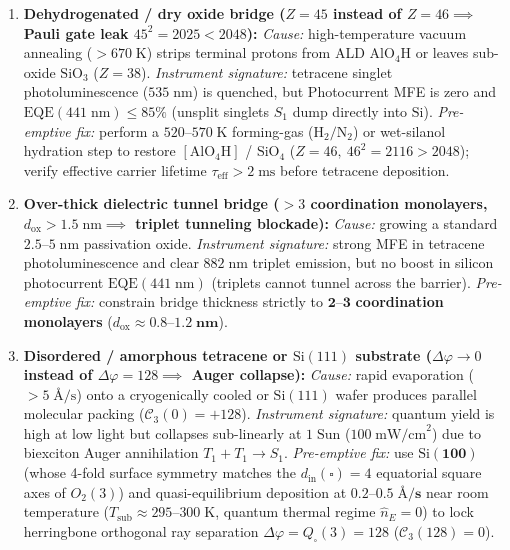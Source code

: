 \documentclass[11pt,a4paper]{article}
\theoremstyle{plain}
\theoremstyle{definition}
\begin{document}
\begin{enumerate}[label=\textbf{(F\arabic*)},leftmargin=*,noitemsep]
\item \textbf{Dehydrogenated / dry oxide bridge ($Z = 45$ instead of $Z = 46 \implies$ Pauli gate leak $45^2 = 2025 < 2048$):}
  \emph{Cause:} high-temperature vacuum annealing ($>670\;\text{K}$) strips terminal protons from ALD $\mathrm{AlO_4H}$ or leaves sub-oxide $\mathrm{SiO_3}$ ($Z=38$).
  \emph{Instrument signature:} tetracene singlet photoluminescence ($535\;\text{nm}$) is quenched, but Photocurrent MFE is zero and $\mathrm{EQE}(441\;\text{nm})\le 85\%$ (unsplit singlets $S_1$ dump directly into $\mathrm{Si}$).
  \emph{Pre-emptive fix:} perform a $520\text{--}570\;\text{K}$ forming-gas ($\mathrm{H_2/N_2}$) or wet-silanol hydration step to restore $[\mathrm{AlO_4H}]$ / $\mathrm{SiO_4}$ ($Z=46,\ 46^2=2116>2048$); verify effective carrier lifetime $\tau_{\mathrm{eff}} > 2\;\text{ms}$ before tetracene deposition.
\item \textbf{Over-thick dielectric tunnel bridge ($>3$ coordination monolayers, $d_{\mathrm{ox}} > 1.5\;\text{nm} \implies$ triplet tunneling blockade):}
  \emph{Cause:} growing a standard $2.5\text{--}5\;\text{nm}$ passivation oxide.
  \emph{Instrument signature:} strong MFE in tetracene photoluminescence and clear $882\;\text{nm}$ triplet emission, but no boost in silicon photocurrent $\mathrm{EQE}(441\;\text{nm})$ (triplets cannot tunnel across the barrier).
  \emph{Pre-emptive fix:} constrain bridge thickness strictly to $\mathbf{2\text{--}3}$ \textbf{coordination monolayers} ($d_{\mathrm{ox}} \approx \mathbf{0.8\text{--}1.2\;\text{nm}}$).
\item \textbf{Disordered / amorphous tetracene or $\mathrm{Si}(111)$ substrate ($\Delta\varphi \to 0$ instead of $\Delta\varphi = 128 \implies$ Auger collapse):}
  \emph{Cause:} rapid evaporation ($>5\;\text{\AA/s}$) onto a cryogenically cooled or $\mathrm{Si}(111)$ wafer produces parallel molecular packing ($\mathcal{C}_3(0) = +128$).
  \emph{Instrument signature:} quantum yield is high at low light but collapses sub-linearly at $1\;\text{Sun}$ ($100\;\text{mW/cm}^2$) due to biexciton Auger annihilation $T_1 + T_1 \to S_1$.
  \emph{Pre-emptive fix:} use $\mathbf{\mathrm{Si}(100)}$ (whose 4-fold surface symmetry matches the $d_{\mathrm{in}}(\square)=4$ equatorial square axes of $O_2(3)$) and quasi-equilibrium deposition at $\mathbf{0.2\text{--}0.5\;\text{\AA/s}}$ near room temperature ($T_{\mathrm{sub}} \approx 295\text{--}300\;\text{K}$, quantum thermal regime $\hat{n}_E = 0$) to lock herringbone orthogonal ray separation $\Delta\varphi = Q_\square(3) = 128$ ($\mathcal{C}_3(128) = 0$).

\end{enumerate}
\end{document}
